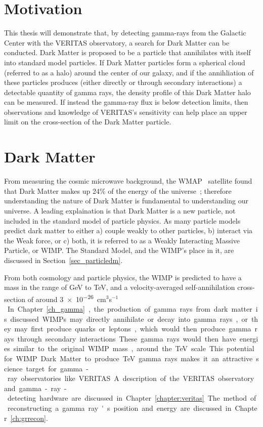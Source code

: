 \section{Motivation}
  This thesis will demonstrate that, by detecting gamma-rays from the Galactic Center with the VERITAS observatory, a search for Dark Matter can be conducted.
  Dark Matter is proposed to be a particle that annihilates with itself into standard model particles.
  If Dark Matter particles form a spherical cloud (referred to as a halo) around the center of our galaxy, and if the annihliation of these particles produces (either directly or through secondary interactions) a detectable quantity of gamma rays, the density profile of this Dark Matter halo can be measured.
  If instead the gamma-ray flux is below detection limits, then observations and knowledge of VERITAS's sensitivity can help place an upper limit on the cross-section of the Dark Matter particle.

\section{Dark Matter}

  From measuring the cosmic microwave background, the WMAP~\cite{wmap9year_obs} satellite found that Dark Matter makes up 24\% of the energy of the universe~\cite{pdg_2012}; therefore understanding the nature of Dark Matter is fundamental to understanding our universe.
  A leading explaination is that Dark Matter is a new particle, not included in the standard model of particle physics.
  As many particle models predict dark matter to either a) couple weakly to other particles, b) interact via the Weak force, or c) both, it is referred to as a Weakly Interacting Massive Particle, or WIMP.
  The Standard Model, and the WIMP's place in it, are discussed in Section~\ref{sec_particledm}.

  From both cosmology and particle physics, the WIMP is predicted to have a mass in the range of GeV to TeV, and a velocity-averaged self-annihilation cross-section of around \nicetilde{}\SI{3e-26}{cm${}^3$s${}^{-1}$}.
  In Chapter~\ref{ch_gamma}, the production of gamma rays from dark matter is discussed.
  WIMPs may directly annihilate or decay into gamma rays, or they may first produce quarks or leptons, which would then produce gamma rays through secondary interactions.
  These gamma rays would then have energies similar to the original WIMP mass, around the TeV scale.
  This potential for WIMP Dark Matter to produce TeV gamma rays makes it an attractive science target for gamma-ray observatories like VERITAS.
  A description of the VERITAS observatory and gamma-ray-detecting hardware are discussed in Chapter~\ref{chapter:veritas}.
  The method of reconstructing a gamma ray's position and energy are discussed in Chapter~\ref{ch:grrecon}.

